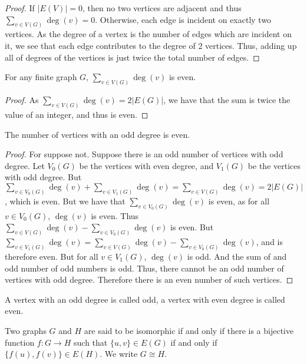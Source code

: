 \documentclass[crop=false,class=book,oneside]{standalone}
\begin{document}
        \begin{proof}
        If $|E(V)| = 0$, then no two vertices are adjacent and thus $\sum_{v\in V(G)}\deg(v) = 0$. Otherwise, each edge is incident on exactly two vertices. As the degree of a vertex is the number of edges which are incident on it, we see that each edge contributes to the degree of 2 vertices. Thus, adding up all of degrees of the vertices is just twice the total number of edges.
        \end{proof}
        \begin{corollary}
        For any finite graph $G$, $\sum_{v\in V(G)}\deg(v)$ is even.
        \end{corollary}
        \begin{proof} As $\sum_{v\in V(G)}\deg(v) = 2|E(G)|$, we have that the sum is twice the value of an integer, and thus is even.
        \end{proof}
        \begin{corollary}
        The number of vertices with an odd degree is even.
        \end{corollary}
        \begin{proof}
        For suppose not. Suppose there is an odd number of vertices with odd degree. Let $V_0(G)$ be the vertices with even degree, and $V_1(G)$ be the vertices with odd degree. But $\sum_{v\in V_0(G)}\deg(v) + \sum_{v\in V_1(G)} \deg(v) = \sum_{v\in V(G)}\deg(v) = 2|E(G)|$, which is even. But we have that $\sum_{v\in V_0(G)}\deg(v)$ is even, as for all $v\in V_{0}(G)$, $\deg(v)$ is even. Thus $\sum_{v\in V(G)}\deg(v) - \sum_{v\in V_0(G)}\deg(v)$ is even. But $\sum_{v\in V_1(G)}\deg(v) = \sum_{v\in V(G)}\deg(v) - \sum_{v\in V_0(G)}\deg(v)$, and is therefore even. But for all $v\in V_1(G)$, $\deg(v)$ is odd. And the sum of and odd number of odd numbers is odd. Thus, there cannot be an odd number of vertices with odd degree. Therefore there is an even number of such vertices.
        \end{proof}
        \begin{definition}
        A vertex with an odd degree is called odd, a vertex with even degree is called even.
        \end{definition}
        \begin{definition}
        Two graphs $G$ and $H$ are said to be isomorphic if and only if there is a bijective function $f:G\rightarrow H$ such that $\{u,v\}\in E(G)$ if and only if $\{f(u),f(v)\}\in E(H)$. We write $G \cong H$.
        \end{definition}
\end{document}
